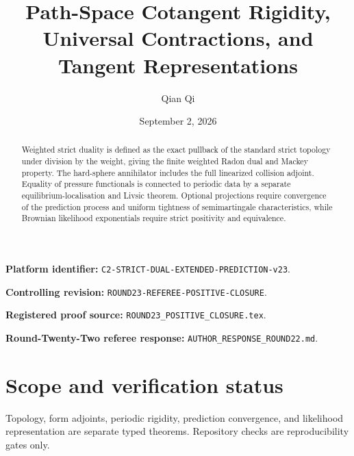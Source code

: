 \documentclass[11pt,reqno]{amsart}
\title[Path-space cotangent rigidity]{Path-Space Cotangent Rigidity, Universal Contractions, and Tangent Representations}
\author{Qian Qi}
\date{September 2, 2026}
\theoremstyle{definition}
\theoremstyle{remark}
\begin{document}
\raggedbottom
\begin{abstract}
Weighted strict duality is defined as the exact pullback of the standard
strict topology under division by the weight, giving the finite weighted
Radon dual and Mackey property.  The hard-sphere annihilator includes the full
linearized collision adjoint.  Equality of pressure functionals is connected
to periodic data by a separate equilibrium-localisation and Livsic theorem.
Optional projections require convergence of the prediction process and
uniform tightness of semimartingale characteristics, while Brownian likelihood
exponentials require strict positivity and equivalence.
\end{abstract}
\maketitle
\noindent\textbf{Platform identifier:} \texttt{C2-STRICT-DUAL-EXTENDED-PREDICTION-v23}.\par
\noindent\textbf{Controlling revision:} \texttt{ROUND23-REFEREE-POSITIVE-CLOSURE}.\par
\noindent\textbf{Registered proof source:} \texttt{ROUND23\_POSITIVE\_CLOSURE.tex}.\par
\noindent\textbf{Round-Twenty-Two referee response:} \texttt{AUTHOR\_RESPONSE\_ROUND22.md}.\par
\tableofcontents

\section*{Scope and verification status}
Topology, form adjoints, periodic rigidity, prediction convergence, and
likelihood representation are separate typed theorems. Repository checks are
reproducibility gates only.
\printbibliography
\end{document}
